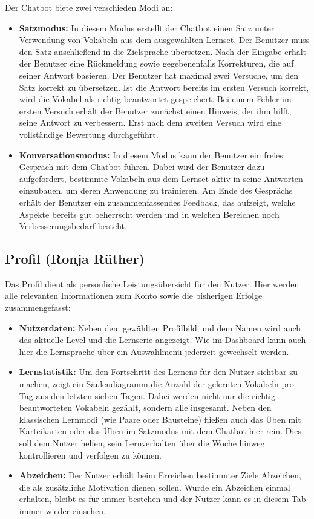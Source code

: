 Der Chatbot biete zwei verschieden Modi an:
\begin{itemize}
\item \textbf{Satzmodus:} In diesem Modus erstellt der Chatbot einen Satz unter Verwendung von Vokabeln aus dem ausgewählten Lernset.
Der Benutzer muss den Satz anschließend in die Zielsprache übersetzen.
Nach der Eingabe erhält der Benutzer eine Rückmeldung sowie gegebenenfalls Korrekturen, die auf seiner Antwort basieren.
Der Benutzer hat maximal zwei Versuche, um den Satz korrekt zu übersetzen. 
Ist die Antwort bereits im ersten Versuch korrekt, wird die Vokabel als richtig beantwortet gespeichert. 
Bei einem Fehler im ersten Versuch erhält der Benutzer zunächst einen Hinweis, der ihm hilft, seine Antwort zu verbessern. 
Erst nach dem zweiten Versuch wird eine vollständige Bewertung durchgeführt.
\item \textbf{Konversationsmodus:} In diesem Modus kann der Benutzer ein freies Gespräch mit dem Chatbot führen.
Dabei wird der Benutzer dazu aufgefordert, bestimmte Vokabeln aus dem Lernset aktiv in seine Antworten einzubauen, um deren Anwendung zu trainieren.
Am Ende des Gesprächs erhält der Benutzer ein zusammenfassendes Feedback, das aufzeigt, welche Aspekte bereits gut beherrscht werden und in welchen Bereichen noch Verbesserungsbedarf besteht.
\end{itemize}

\subsection{Profil (Ronja Rüther)}
Das Profil dient als persönliche Leistungsübersicht für den Nutzer. Hier werden alle relevanten Informationen zum Konto sowie die bisherigen Erfolge zusammengefasst:

\begin{itemize}
\item \textbf{Nutzerdaten:} Neben dem gewählten Profilbild und dem Namen wird auch das aktuelle Level und die Lernserie angezeigt. Wie im Dashboard kann auch hier die Lernsprache über ein Auswahlmenü jederzeit gewechselt werden.
\item \textbf{Lernstatistik:} Um den Fortschritt des Lernens für den Nutzer sichtbar zu machen, zeigt ein Säulendiagramm die Anzahl der gelernten Vokabeln pro Tag aus den letzten sieben Tagen. Dabei werden nicht nur die richtig beantworteten Vokabeln gezählt, sondern alle insgesamt. Neben den klassischen Lernmodi (wie Paare oder Bausteine) fließen auch das Üben mit Karteikarten oder das Üben im Satzmodus mit dem Chatbot hier rein. Dies soll dem Nutzer helfen, sein Lernverhalten über die Woche hinweg kontrollieren und verfolgen zu können.
\item \textbf{Abzeichen:} Der Nutzer erhält beim Erreichen bestimmter Ziele Abzeichen, die als zusätzliche Motivation dienen sollen. Wurde ein Abzeichen einmal erhalten, bleibt es für immer bestehen und der Nutzer kann es in diesem Tab immer wieder einsehen.
\end{itemize}

